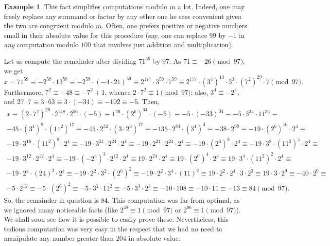 \documentclass[12pt,notitlepage]{article}
\theoremstyle{plain}
\theoremstyle{definition}
\newtheorem{exm}[thm]{Example}
\theoremstyle{plain}
\newcommand{\1}{\mathbf{1}}
\newcommand{\0}{\mathbf{0}}
\begin{document}
\begin{exm}
This fact simplifies computations modulo $m$ a lot. Indeed, one may freely replace any summand or factor by any other one he sees convenient given the two are congruent modulo $m$. Often, one prefers positive or negative numbers small in their absolute value for this procedure (say, one can replace $99$ by $-1$ in \emph{any} computation modulo $100$ that involves just addition and multiplication).

Let us compute the remainder after dividing $71^{59}$ by $97$. As $71 \equiv -26 \pmod{97}$, we get
$$x = 71^{59} \equiv -2^{59}\cdot 13^{59} \equiv -2^{59}\cdot (-4\cdot 21)^{59} \equiv 2^{177} \cdot 3^{59} \cdot 7^{59} \equiv 2^{177} \cdot (3^4)^{14} \cdot 3^3 \cdot (7^2)^{29} \cdot 7  \pmod {97}.$$
Furthermore, $7^2 \equiv -48 \equiv -7^2 + 1$, whence $2\cdot7^2 \equiv 1 \pmod{97}$; also, $3^4 \equiv -2^4$, and $27\cdot 7 \equiv 3 \cdot 63 \equiv 3 \cdot (-34) \equiv -102 \equiv -5$. Then,
\begin{multline*}
x \equiv (2\cdot 7^2)^{29} \cdot 2^{148} \cdot 2^{56} \cdot (-5) \equiv 1^{29} \cdot (2^6)^{34} \cdot (-5) \equiv -5 \cdot (-33) ^{34} \equiv -5 \cdot 3^{34} \cdot 11^{34}  \equiv \\
-45 \cdot (3^4)^{8} \cdot (11^2)^{17} \equiv -45 \cdot 2^{32} \cdot (3 \cdot 2^3)^{17} \equiv -135 \cdot 2^{83} \cdot (3^4)^4  \equiv -38 \cdot 2^{99} \equiv -19 \cdot (2^6)^{16} \cdot 2^4 \equiv \\
-19 \cdot 3^{16} \cdot (11^2)^8 \cdot 2^4 \equiv -19 \cdot 3^{24} \cdot 2^{24} \cdot 2^4 \equiv -19 \cdot 2^{24} \cdot 2^{24} \cdot 2^4  \equiv -19 \cdot (2^6)^8 \cdot 2^4 \equiv -19 \cdot 3^{8} \cdot (11^2)^4 \cdot 2^4 \equiv\\
 -19 \cdot 3^{12} \cdot 2^{12} \cdot 2^{4} \equiv -19 \cdot (-2^{4})^3 \cdot 2^{12} \cdot 2^4 \equiv 19 \cdot 2^{24} \cdot 2^4 \equiv 19 \cdot (2^6)^4 \cdot 2^4 \equiv 19 \cdot 3^{4} \cdot (11^2)^2 \cdot 2^4 \equiv\\
 -19 \cdot 2^{4} \cdot (24)^2 \cdot 2^4 \equiv -19 \cdot 2^2 \cdot 3^2 \cdot (2^6)^2 \equiv -19 \cdot 2^2 \cdot 3^4 \cdot (11)^2 \equiv 19 \cdot 2^2 \cdot 2^4 \cdot 3 \cdot 2^3 \equiv 19 \cdot 3 \cdot 2^9 \equiv -40 \cdot 2^9 \equiv\\
  -5 \cdot 2^{12} \equiv -5 \cdot (2^6)^2 \equiv -5 \cdot 3^2 \cdot 11^2 \equiv
 -5 \cdot 3^3 \cdot 2^3 \equiv -10 \cdot 108 \equiv -10 \cdot 11 \equiv -13 \equiv 84 \pmod {97}.
\end{multline*}
So, the remainder in question is $84$. This computation was far from optimal, as we ignored many noticeable facts (like $2^{48} \equiv 1 \pmod {97}$ or $2^{96} \equiv 1 \pmod {97}$). We shall soon see how it is possible to easily prove these. Nevertheless, this tedious computation was very easy in the respect that we had no need to manipulate any number greater than $204$ in absolute value.
\end{exm}
\end{document}
